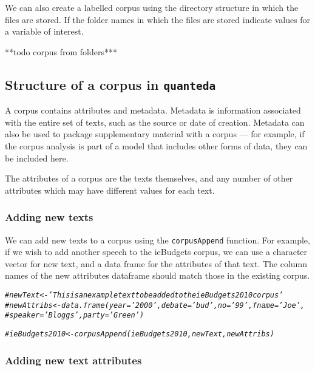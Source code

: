 \documentclass[11pt]{article}\usepackage[]{graphicx}\usepackage[]{color}
\makeatletter
\newcommand{\hlcom}[1]{\textcolor[rgb]{0.678,0.584,0.686}{\textit{#1}}}%
\newenvironment{kframe}{%
 \def\at@end@of@kframe{}%
 \ifinner\ifhmode%
  \def\at@end@of@kframe{\end{minipage}}%
  \begin{minipage}{\columnwidth}%
 \fi\fi%
 \def\FrameCommand##1{\hskip\@totalleftmargin \hskip-\fboxsep
 \colorbox{shadecolor}{##1}\hskip-\fboxsep
     \hskip-\linewidth \hskip-\@totalleftmargin \hskip\columnwidth}%
 \MakeFramed {\advance\hsize-\width
   \@totalleftmargin\z@ \linewidth\hsize
   \@setminipage}}%
 {\par\unskip\endMakeFramed%
 \at@end@of@kframe}
\newenvironment{knitrout}{}{} %
\makeatother
\begin{document}
We can also create a labelled corpus using the directory structure in which the files are stored. If the folder names in which the files are stored indicate values for a variable of interest.

**todo corpus from folders***

\subsection{Structure of a corpus in \texttt{quanteda}}
A corpus contains attributes and metadata. Metadata is information associated with the entire set of texts, such as the source or date of creation. Metadata can also be used to package supplementary material with a corpus --- for example, if the corpus analysis is part of a model that includes other forms of data, they can be included here.

The attributes of a corpus are the texts themselves, and any number of other attributes which may have different values for each text.



\subsubsection{Adding new texts}

We can add new texts to a corpus using the \texttt{corpusAppend} function. For example, if we wish to add another speech to the ieBudgets corpus, we can use a character vector for new text, and a data frame for the attributes of that text. The column names of the new attributes dataframe should match those in the existing corpus. 

\begin{knitrout}\footnotesize
{}\color{fgcolor}\begin{kframe}
\begin{alltt}
\hlcom{# newText <-'This is an example text to be added to the ieBudgets2010 corpus'}
\hlcom{# newAttribs <- data.frame(year='2000', debate='bud', no='99', fname='Joe',}
\hlcom{# speaker='Bloggs', party='Green' )}

\hlcom{# ieBudgets2010 <- corpusAppend(ieBudgets2010, newText, newAttribs)}
\end{alltt}
\end{kframe}
\end{knitrout}



\subsubsection{Adding new text attributes}
\end{document}
